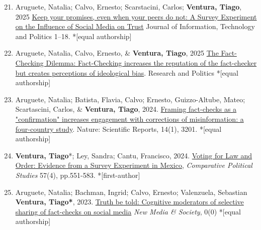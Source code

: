 \documentclass[letterpaper, 11pt]{article}
\newenvironment{benumerate}[1]{
    \let\oldItem\item
    \def\item{\addtocounter{enumi}{-2}\oldItem}
    \begin{enumerate}[leftmargin=2em]
    \setcounter{enumi}{#1}
    \addtocounter{enumi}{1}
}{
    \end{enumerate}
}
\begin{document}
\begin{benumerate}{20}
        \subitem \textit{Winner of the 2024 Paul Lazarsfeld Best Paper Award, recognizing the best overall paper presented on the topic of Political Communication at the 2023 APSA meeting}
        \subitem  \textit{Winner of the 2024 Information Technology and Politics Award recognizing the best overall paper presented on the topic at the 2023 APSA meeting}
       \subitem \textit{Winner of the 2024 Best Paper in Political Behavior presented at the Brazilian Political Science Association Meeting}
       \subitem \textit{Winner of the 2024 Best Overall Paper presented at the Brazilian Political Science Association Meeting}

       \item  Aruguete, Natalia; Calvo, Ernesto; Scarstacini, Carlos; \textbf{Ventura, Tiago}, 2025 \href{https://www.tandfonline.com/doi/full/10.1080/19331681.2025.2502503}{Keep your promises, even when your peers do not: A Survey Experiment on the Influence of Social Media on Trust}
       Journal of Information, Technology and Politics 1–18. *[equal authorship]


        \item Aruguete, Natalia, Calvo, Ernesto, \& \textbf{Ventura, Tiago}, 2025 \href{https://journals.sagepub.com/doi/10.1177/20531680251323120}{The Fact-Checking Dilemma: Fact-Checking increases the reputation of the fact-checker but creates perceptions of ideological bias}.  Research and Politics *[equal authorship]

       \item Aruguete, Natalia; Batista, Flavia, Calvo; Ernesto, Guizzo-Altube, Mateo; Scartascini, Carlos, \& \textbf{Ventura, Tiago}, 2024. \href{https://www.nature.com/articles/s41598-024-53337-0}{Framing fact-checks as a "confirmation" increases engagement with corrections of misinformation: a four-country study}. Nature: Scientific Reports, 14(1), 3201. *[equal authorship]

       \item \textbf{Ventura, Tiago}*; Ley, Sandra; Cantu, Francisco, 2024. \href{https://journals.sagepub.com/doi/10.1177/00104140231169035}{Voting for Law and Order: Evidence from a Survey Experiment in Mexico}, \textit{Comparative Political Studies} 57(4), pp.551-583. *[first-author]

        \item Aruguete, Natalia; Bachman, Ingrid; Calvo, Ernesto; Valenzuela, Sebastian \textbf{Ventura, Tiago*}, 2023. \href{https://journals.sagepub.com/doi/abs/10.1177/14614448231193709}{Truth be told: Cognitive moderators of selective sharing of fact-checks on social media} \textit{New Media \& Society}, 0(0)  *[equal authorship]



\end{benumerate}
\end{document}
